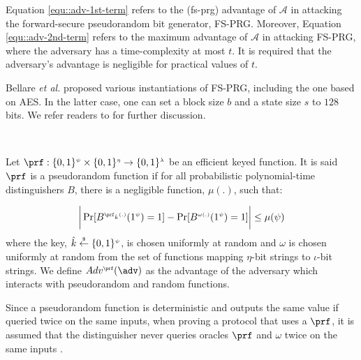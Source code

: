 Equation \ref{equ::adv-1st-term}  refers to the (fs-prg) advantage of $\mathcal{A}$ in attacking the forward-secure pseudorandom bit generator, FS-PRG. Moreover, Equation \ref{equ::adv-2nd-term} refers to the maximum advantage of $\mathcal{A}$ in attacking FS-PRG, where the adversary has a time-complexity at most $t$. It is required that the adversary's advantage is negligible for practical values of $t$. 




Bellare \textit{et al.} \cite{BellareY03} proposed various instantiations of FS-PRG, including the one based on AES. In the latter case, one can set a block size $b$ and a state size $s$ to $128$ bits. We refer readers to \cite{BellareY03} for further discussion. 


\

\begin{definition} Let $\prf:\{0,1\}^{\sss\psi}\times \{0,1\}^{\sss \eta}\rightarrow \{0,1\}^{\sss  \lambda}$ be an efficient  keyed function. It is said $\prf$ is a pseudorandom function if for all probabilistic polynomial-time distinguishers $B$, there is a negligible function, $\mu(.)$, such that:
%

\begin{equation*}
\bigg | \Pr[B^{\sss \prf_{\hat{k}}(.)}(1^{\sss \psi})=1]- \Pr[B^{\sss \omega(.)}(1^{\sss \psi})=1] \bigg |\leq\mu(\psi)
\end{equation*}
%
where  the key, $\hat{k}\stackrel{\scriptscriptstyle\$}\leftarrow\{0,1\}^{\scriptscriptstyle\psi}$, is chosen uniformly at random and $\omega$ is chosen uniformly at random from the set of functions mapping $\eta$-bit strings to $\iota$-bit strings. We define $Adv^{\sss\prf}(\adv)$ as the advantage of the adversary which interacts with pseudorandom and random functions. 

\end{definition}

Since a pseudorandom function is deterministic and outputs the same value if queried twice on the same inputs, when proving a protocol that uses a $\prf$, it is assumed that the distinguisher never queries oracles $\prf$ and $\omega$ twice on the same inputs \cite{KatzLindell2014}. 

\clearpage

